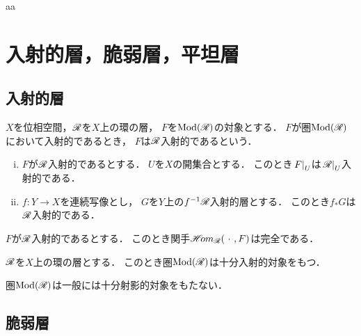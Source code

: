 \begin{NTT}\label{NTT2312}
    aa
\end{NTT}







\section{入射的層，脆弱層，平坦層}
\subsection*{入射的層}
\(X\)を位相空間，\(\scR\)を\(X\)上の環の層，
\(F\)を\(\Mod(\scR)\)の対象とする．
\(F\)が圏\(\Mod(\scR)\)において入射的であるとき，
\(F\)は\(\scR\)入射的であるという．

\begin{leftbar}
\begin{PRP}\label{PRP241}
    \begin{enumerate}[(i)]
        \item \(F\)が\(\scR\)入射的であるとする．
        \(U\)を\(X\)の開集合とする．
        このとき\(\mres[F]{U}\)は\(\mres[\scR]{U}\)入射的である．
        \item \(f\colon Y\to X\)を連続写像とし，
        \(G\)を\(Y\)上の\(f^{-1}\scR\)入射的層とする．
        このとき\(f_{\ast}G\)は\(\scR\)入射的である．
    \end{enumerate}
\end{PRP}
\end{leftbar}

\begin{leftbar}
\begin{CRL}\label{CRL242}
    \(F\)が\(\scR\)入射的であるとする．
    このとき関手\(\HOM_{\scR}(\blk,F)\)は完全である．
\end{CRL}
\end{leftbar}

\begin{leftbar}
\begin{PRP}\label{PRP243}
    \(\scR\)を\(X\)上の環の層とする．
    このとき圏\(\Mod(\scR)\)は十分入射的対象をもつ．
\end{PRP}
\end{leftbar}

\begin{RMK}\label{RMK244}
    圏\(\Mod(\scR)\)は一般には十分射影的対象をもたない．
\end{RMK}
\subsection*{脆弱層}

